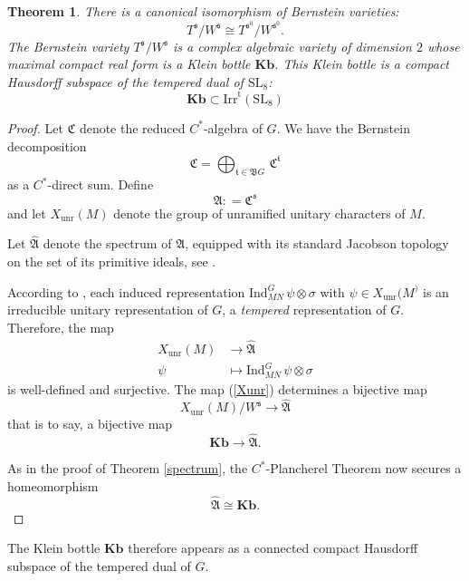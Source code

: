 \documentclass[11pt]{amsart}
\newtheorem{theorem}{Theorem}[section]
\theoremstyle{remark}
\theoremstyle{definition}
\def\Irr{mathbf{Irr}}
\def\fB{\mathfrak{B}}
\def\Irr{\mathrm{Irr}}
\newcommand{\SL}{\mathrm{SL}}
\newcommand{\unr}{\mathrm{unr}}
\def\temp{\mathrm{t}}
\newcommand{\fs}{\mathfrak{s}}
\def\fA{\mathfrak{A}}
\def\fC{\mathfrak{C}}
\def\fB{\mathfrak{B}}
\def\ft{\mathfrak{t}}
\begin{document}
\begin{theorem}   There is a canonical isomorphism of Bernstein varieties:
\[
T^\fs / W^\fs \cong T^{\fs^0} / W^{\fs^0}.
\]
The Bernstein variety $T^\fs / W^\fs$ is a complex algebraic variety of dimension $2$ whose maximal compact real form is a Klein bottle $\mathbf{Kb}$.   This Klein bottle is a  compact Hausdorff subspace of the  tempered dual of 
$\SL_8$:   
\[
\mathbf{Kb} \subset \Irr^\temp(\SL_8)
\]
\end{theorem}

\begin{proof}
Let $\fC$ denote the reduced $C^\ast$-algebra of $G$.   We have the Bernstein decomposition
\[
\fC  = \bigoplus_{\ft\in\fB G} \, \fC^{\ft}
\]
as a $C^\ast$-direct sum.   Define
\[
\fA: = \fC^{\fs}
\]
and let $X_{\unr}(M)$ denote the group of unramified unitary characters of $M$.   

  
 Let $\widehat{\fA}$ denote the spectrum of $\fA$, equipped with its standard Jacobson topology on the set of its primitive ideals, see \cite[\S3.1]{D}.  
 
According to \cite[\S4.1]{R}, each induced representation $\mathrm{Ind}_{MN}^{G} \, \psi \otimes \sigma$ with $ \psi \in X_{\unr}(M^)$ is an irreducible unitary representation of $G$,  a \emph{tempered}
representation of $G$.      Therefore, the map
\begin{align}\label{Xunr}
X_{\unr}(M) & \longrightarrow \widehat{\fA} \\
\psi & \mapsto \mathrm{Ind}_{MN}^{G} \, \psi \otimes \sigma  \nonumber
\end{align}
is well-defined and surjective.   The map (\ref{Xunr}) determines a bijective map
\[
X_{\unr}(M) / W^{\fs} \longrightarrow \widehat{\fA}
\]
that is to say,  a bijective map
\[
\mathbf{Kb} \longrightarrow \widehat{\fA}.
\]  

As in the proof of Theorem \ref{spectrum}, the $C^*$-Plancherel Theorem  now secures a homeomorphism
\[
\widehat{\fA} \cong \mathbf{Kb}.
\]
\end{proof} 

The Klein bottle $\mathbf{Kb}$ therefore appears as a  connected compact Hausdorff subspace of the tempered dual of $G$.   


\smallskip  
\end{document}
